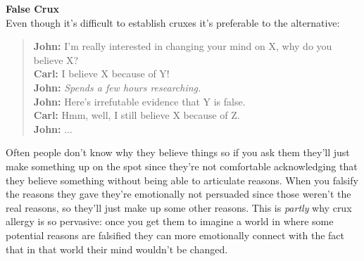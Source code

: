 \par
\textbf{False Crux}\\
Even though it's difficult to establish cruxes it's preferable to the alternative:
\begin{quote}
    \textbf{John:} I'm really interested in changing your mind on X, why do you believe X?\\
    \textbf{Carl:} I believe X because of Y!\\
    \textbf{John:} \textit{Spends a few hours researching.}\\
    \textbf{John:} Here's irrefutable evidence that Y is false.\\
    \textbf{Carl:} Hmm, well, I still believe X because of Z.\\
    \textbf{John:} ...\\
\end{quote}
Often people don't know why they believe things so if you ask them they'll just make something up on the spot since they're not comfortable acknowledging that they believe something without being able to articulate reasons.
When you falsify the reasons they gave they're emotionally not persuaded since those weren't the real reasons, so they'll just make up some other reasons. This is \textit{partly} why crux allergy is so pervasive: once you get them to imagine a world in where some potential reasons are falsified they can more emotionally connect with the fact that in that world their mind wouldn't be changed.
\par
\textbf{}\\


